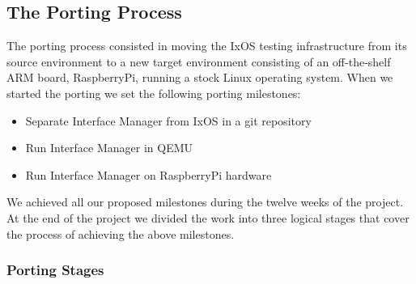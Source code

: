 
\subsection{The Porting Process}

The porting process consisted in moving the IxOS testing infrastructure from its
source environment to a new target environment consisting of an off-the-shelf
ARM board, RaspberryPi, running a stock Linux operating system. When we started
the porting we set the following porting milestones:
\begin{itemize}
    \item Separate Interface Manager from IxOS in a git repository
    \item Run Interface Manager in QEMU
    \item Run Interface Manager on RaspberryPi hardware
\end{itemize}
We achieved all our proposed milestones during the twelve weeks of the project.
At the end of the project we divided the work into three logical stages
that cover the process of achieving the above milestones.

\subsubsection{Porting Stages}


